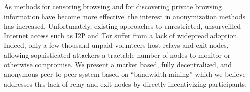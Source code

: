 
As methods for censoring browsing and for discovering private browsing information have become more effective, the interest in anonymization methods has increased. Unfortunately, existing approaches to unrestricted, unsurveilled Internet access such as I2P and Tor suffer from a lack of widepread adoption.  Indeed,  only a few thousand unpaid volunteers host relays and exit nodes, allowing sophisticated attackers a tractable number of nodes to monitor or otherwise compromise. We present a market based, fully decentralized, and anonymous peer-to-peer system based on “bandwidth mining” which we believe addresses this lack of relay and exit nodes by directly incentivizing participants.





